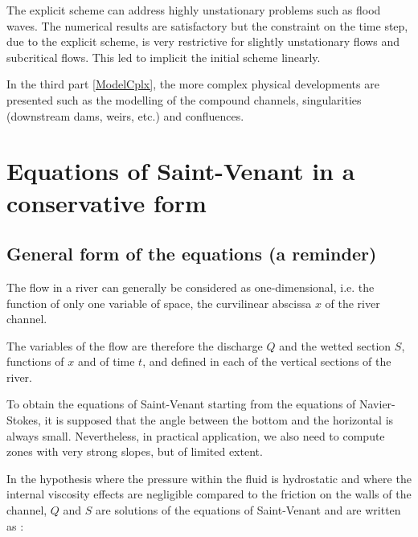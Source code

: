 The explicit scheme can address highly unstationary problems such as flood waves. The numerical results are satisfactory but the constraint on the time step, due to the explicit scheme, is very restrictive for slightly unstationary flows and subcritical flows. This led to implicit the initial scheme linearly.

In the third part \ref{ModelCplx}, the more complex physical developments are presented such as the modelling of the compound channels, singularities (downstream dams, weirs, etc.) and confluences.

\section{Equations of Saint-Venant in a conservative form}
\label{ESVTcons}

\subsection{General form of the equations (a reminder)}

The flow in a river can generally be considered as one-dimensional, i.e. the function of only one variable of space, the curvilinear abscissa $x$ of the river channel.

The variables of the flow are therefore the discharge $Q$ and the wetted section $S$, functions of $x$ and of time $t$, and defined in each of the vertical sections of the river.

To obtain the equations of Saint-Venant starting from the equations of Navier-Stokes, it is supposed that the angle between the bottom and the horizontal is always small. Nevertheless, in practical application, we also need to compute zones with very strong slopes, but of limited extent.

In the hypothesis where the pressure within the fluid is hydrostatic and where the internal viscosity effects are negligible compared to the friction on the walls of the channel, $Q$ and $S$ are solutions of the equations of Saint-Venant and are written as \cite{GOUTAL91} \cite{AFIF86} :

